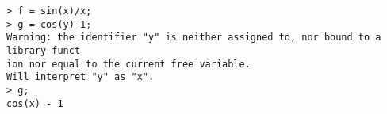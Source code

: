 \begin{center}\begin{minipage}{15cm}\begin{Verbatim}[frame=single]
> f = sin(x)/x;
> g = cos(y)-1;
Warning: the identifier "y" is neither assigned to, nor bound to a library funct
ion nor equal to the current free variable.
Will interpret "y" as "x".
> g;
cos(x) - 1
\end{Verbatim}
\end{minipage}\end{center}
 